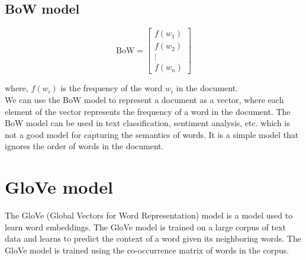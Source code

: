 \subsection{BoW model} 

$$
    \text{BoW} = \left[ \begin{matrix} f(w_1) \\ f(w_2) \\ \vdots \\ f(w_n) \end{matrix} \right]
$$

where, $f(w_i)$ is the frequency of the word $w_i$ in the document.\\

We can use the BoW model to represent a document as a vector, where each element of the vector represents the frequency of a word in the document. The BoW model can be used in text classification, sentiment analysis, etc. which is not a good model for capturing the semantics of words.
It is a simple model that ignores the order of words in the document.

\section{GloVe model}

The GloVe (Global Vectors for Word Representation) model is a model used to learn word embeddings. The GloVe model is trained on a large corpus of text data and learns to predict the context of a word given its neighboring words. 
The GloVe model is trained using the co-occurrence matrix of words in the corpus.